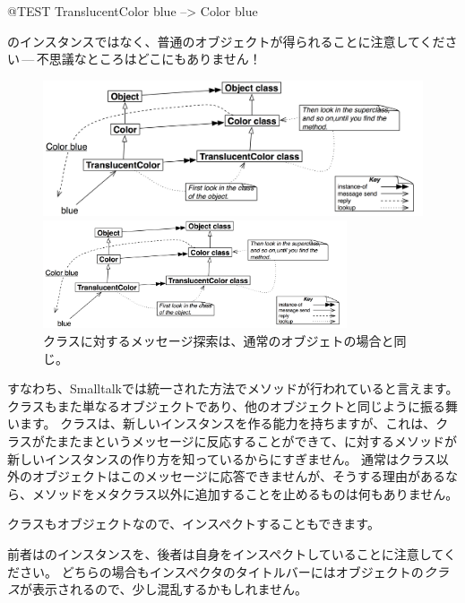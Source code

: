 \documentclass[a4paper,10pt,twoside]{book}
\begin{document}
\begin{code}{@TEST}
TranslucentColor blue --> Color blue
\end{code}
\noindent
{}のインスタンスではなく、普通のオブジェクトが得られることに注意してください\,---\,不思議なところはどこにもありません！

\begin{center}
\begin{figure}[!ht]
\ifluluelse
	{\centerline {\includegraphics[width=\textwidth]{TranslucentColorBlue}}}
	{\centerline {\includegraphics[width=0.8\textwidth]{TranslucentColorBlue}}}
\caption{クラスに対するメッセージ探索は、通常のオブジェトの場合と同じ。}
\end{figure}
\end{center}

すなわち、Smalltalkでは統一された方法でメソッドが行われていると言えます。クラスもまた単なるオブジェクトであり、他のオブジェクトと同じように振る舞います。
クラスは、新しいインスタンスを作る能力を持ちますが、これは、クラスがたまたまというメッセージに反応することができて、に対するメソッドが新しいインスタンスの作り方を知っているからにすぎません。
通常はクラス以外のオブジェクトはこのメッセージに応答できませんが、そうする理由があるなら、メソッドをメタクラス以外に追加することを止めるものは何もありません。

クラスもオブジェクトなので、インスペクトすることもできます。


\noindent
前者はのインスタンスを、後者は自身をインスペクトしていることに注意してください。
どちらの場合もインスペクタのタイトルバーにはオブジェクトの\emph{クラス}が表示されるので、少し混乱するかもしれません。
\end{document}
